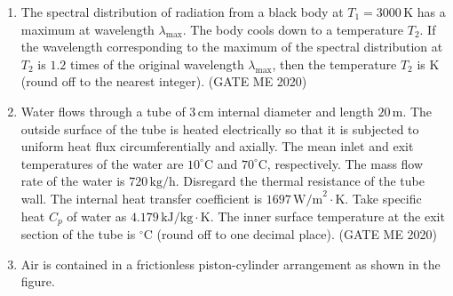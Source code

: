 \documentclass[journal]{IEEEtran}
\begin{document}
\begin{enumerate}
\item
The spectral distribution of radiation from a black body at $T_1 = 3000 \, \text{K}$ has a maximum at wavelength $\lambda_{\text{max}}$. The body cools down to a temperature $T_2$. If the wavelength corresponding to the maximum of the spectral distribution at $T_2$ is $1.2$ times of the original wavelength $\lambda_{\text{max}}$, then the temperature $T_2$ is \underline{\hspace{3cm}} K (round off to the nearest integer). \hfill (GATE ME 2020)

\item
Water flows through a tube of $3 \, \text{cm}$ internal diameter and length $20 \, \text{m}$. The outside surface of the tube is heated electrically so that it is subjected to uniform heat flux circumferentially and axially. The mean inlet and exit temperatures of the water are $10^\circ \text{C}$ and $70^\circ \text{C}$, respectively. The mass flow rate of the water is $720 \, \text{kg/h}$. Disregard the thermal resistance of the tube wall. The internal heat transfer coefficient is $1697 \, \text{W/m}^2\cdot\text{K}$. Take specific heat $C_p$ of water as $4.179 \, \text{kJ/kg}\cdot\text{K}$. The inner surface temperature at the exit section of the tube is \underline{\hspace{3cm}} $^\circ \text{C}$ (round off to one decimal place). \hfill (GATE ME 2020)

\item
Air is contained in a frictionless piston-cylinder arrangement as shown in the figure.

\begin{center}    
%
\end{center}


\end{enumerate}
\end{document}
